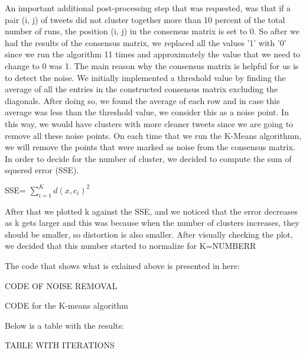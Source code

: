 \documentclass{article}
\begin{document}
An important additional post-processing step that was requested, was that if a pair (i, j) of tweets did not cluster together more than 10 percent of the total number of runs, the position (i, j) in the consensus matrix is set to 0. So after we had the results of the consensus matrix, we replaced all the values '1' with '0' since we run the algorithm 11 times and approximately the value that we need to change to 0 was 1. 
The main reason why the consensus matrix is helpful for us is to detect the noise. We initially implemented a threshold value by finding the average of all the entries in the constructed consensus matrix excluding the diagonals. After doing so, we found the average of each row and in case this average was less than the threshold value, we consider this as a noise point. In this way, we would have clusters with more cleaner tweets since we are going to remove all these noise points. On each time that we run the K-Means algorithmn, we will remove the points that were marked as noise from the consensus matrix. 
In order to decide for the number of cluster, we decided to compute the sum of squered error (SSE). 

SSE= $\sum\limits_{i=1}^K d(x,c_{i})^2 $

After that we plotted k against the SSE, and we noticed that the error decreases as k gets larger and this was because when the number of clusters increases, they should be smaller, so distortion is also smaller. After visually checking the plot, we decided that this number started to normalize for K=NUMBERR





The code that shows what is exlained above is presented in here: 

CODE OF NOISE REMOVAL



CODE for the K-means algorithm



Below is a table with the results: 

TABLE WITH ITERATIONS
\end{document}
